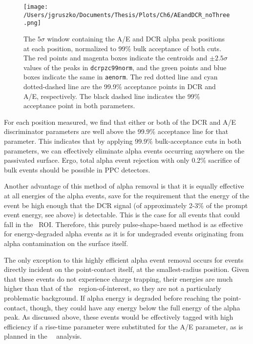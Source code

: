 \begin{figure*}[]
 \centering
 \texttt{[image: /Users/jgruszko/Documents/Thesis/Plots/Ch6/AEandDCR\_noThree.png]}
 \caption[A plot of A/E and DCR alpha peak positions, showing the complementarity of the pulse shape discriminators]{The $5\sigma$ window containing the A/E and DCR alpha peak positions at each position, normalized to 99\% bulk acceptance of both cuts. The red points and magenta boxes indicate the centroids and $\pm 2.5\sigma$ values of the peaks in {\tt dcrpzc99norm}, and the green points and blue boxes indicate the same in {\tt aenorm}. The red dotted line and cyan dotted-dashed line are the 99.9\% acceptance points in DCR and A/E, respectively. The black dashed line indicates the 99\% acceptance point in both parameters.} 
 \label{fig:AEandDCR}
\end{figure*}

For each position measured, we find that either or both of the DCR and A/E discriminator parameters are well above the 99.9\% acceptance line for that parameter. This indicates that by applying 99.9\% bulk-acceptance cuts in both parameters, we can effectively eliminate alpha events occurring anywhere on the passivated surface. Ergo, total alpha event rejection with only 0.2\% sacrifice of bulk events should be possible in PPC detectors.

Another advantage of this method of alpha removal is that it is equally effective at all energies of the alpha events, save for the requirement that the energy of the event be high enough that the DCR signal (of approximately 2-3\% of the prompt event energy, see above) is detectable. This is the case for all events that could fall in the \nonubb\ ROI. Therefore, this purely pulse-shape-based method is as effective for energy-degraded alpha events as it is for undegraded events originating from alpha contamination on the surface itself.

The only exception to this highly efficient alpha event removal occurs for events directly incident on the point-contact itself, at the smallest-radius position. Given that these events do not experience charge trapping, their energies are much higher than that of the \nonubb\ region-of-interest, so they are not a particularly problematic background. If alpha energy is degraded before reaching the point-contact, though, they could have any energy below the full energy of the alpha peak. As discussed above, these events would be effectively tagged with high efficiency if a rise-time parameter were substituted for the A/E parameter, as is planned in the \MJ\ \DEM\ analysis. 


